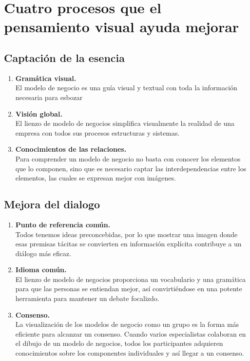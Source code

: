 \documentclass[11pt]{book}
\begin{document}
\section{Cuatro procesos que el pensamiento visual ayuda mejorar}
\subsection{Captación de la esencia}
\begin{enumerate}
\item \textbf{Gramática visual.}\\
El modelo de negocio es una guía visual y textual con toda la información necesaria para esbozar 
\item \textbf{Visión global.}\\
El lienzo de modelo de negocios simplifica visualmente la realidad de una empresa con todos sus procesos estructuras y sistemas.
\item \textbf{Conocimientos de las relaciones.}\\
Para comprender un modelo de negocio no basta con conocer los elementos que lo componen, sino que es necesario captar las interdependencias entre los elementos, las cuales se expresan mejor con imágenes. 
\end{enumerate}
\subsection{Mejora del dialogo}
\begin{enumerate}
\item \textbf{Punto de referencia común.}\\
Todos tenemos ideas preconcebidas, por lo que mostrar una imagen donde esas premisas tácitas se convierten en información explícita contribuye a un diálogo más eficaz.
\item \textbf{Idioma común.}\\
El lienzo de modelo de negocios proporciona un vocabulario y una gramática para que las personas se entiendan mejor, así convirtiéndose en una potente herramienta para mantener un debate focalizdo.
\item \textbf{Consenso.}\\
La visualización de los modelos de negocio como un grupo es la forma más eficiente para alcanzar un consenso. Cuando varios especialistas colaboran en el dibujo de un modelo de negocios, todos los participantes adquieren conocimientos sobre los componentes individuales y así llegar a un consenso.
\end{enumerate}
\end{document}
